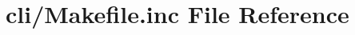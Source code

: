 \hypertarget{cli_2_makefile_8inc}{\section{cli/\+Makefile.inc File Reference}
\label{cli_2_makefile_8inc}
}
